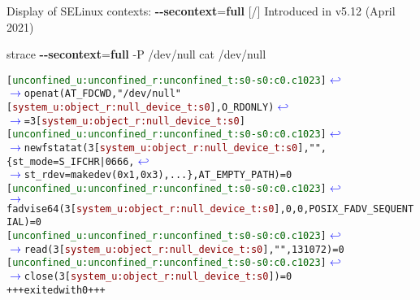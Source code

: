 \documentclass[unicode,aspectratio=169,xcolor={table,dvipsnames,usernames}]{beamer}
\newcommand{\symlinebreak}{\textcolor{blue}{\(\hookleftarrow\)}}
\newcommand{\symlinecont}{\textcolor{blue}{\(\longrightarrow\)}}
\begin{document}
\begin{frame}[fragile]{Display of SELinux contexts: \textbf{-{}-secontext}=\textbf{full} \hfill [\insertframenumber/\inserttotalframenumber]}
Introduced in v5.12 (April 2021)

\begin{block}{strace \textbf{-{}-secontext}=\textbf{full} -P /dev/null cat /dev/null}
\scriptsize
\begin{alltt}
[\textcolor{darkgreen}{unconfined_u:unconfined_r:unconfined_t:s0-s0:c0.c1023}] \symlinebreak
\symlinecont openat(AT_FDCWD, "/dev/null" [\textcolor{darkred}{system_u:object_r:null_device_t:s0}], O_RDONLY) \symlinebreak
\symlinecont = 3 [\textcolor{darkred}{system_u:object_r:null_device_t:s0}]
[\textcolor{darkgreen}{unconfined_u:unconfined_r:unconfined_t:s0-s0:c0.c1023}] \symlinebreak
\symlinecont newfstatat(3 [\textcolor{darkred}{system_u:object_r:null_device_t:s0}], "", \{st_mode=S_IFCHR|0666, \symlinebreak
\symlinecont st_rdev=makedev(0x1, 0x3), ...\}, AT_EMPTY_PATH) = 0
[\textcolor{darkgreen}{unconfined_u:unconfined_r:unconfined_t:s0-s0:c0.c1023}] \symlinebreak
\symlinecont fadvise64(3 [\textcolor{darkred}{system_u:object_r:null_device_t:s0}], 0, 0, POSIX_FADV_SEQUENTIAL) = 0
[\textcolor{darkgreen}{unconfined_u:unconfined_r:unconfined_t:s0-s0:c0.c1023}] \symlinebreak
\symlinecont read(3 [\textcolor{darkred}{system_u:object_r:null_device_t:s0}], "", 131072) = 0
[\textcolor{darkgreen}{unconfined_u:unconfined_r:unconfined_t:s0-s0:c0.c1023}] \symlinebreak
\symlinecont close(3 [\textcolor{darkred}{system_u:object_r:null_device_t:s0}]) = 0
+++ exited with 0 +++
\end{alltt}
\end{block}
\end{frame}
\end{document}
